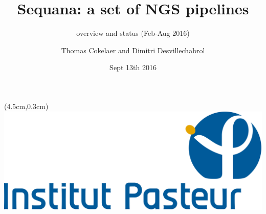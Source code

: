 \documentclass{beamer}
\title{Sequana: a set of NGS pipelines}
\subtitle{overview and status (Feb-Aug 2016)}
\author[T.Cokelaer \& D.Desvillechabrol]{Thomas Cokelaer and Dimitri Desvillechabrol}
\institute{Institut Pasteur}
\date{Sept 13th 2016}
\begin{document}

\begin{frame}[plain]
    \titlepage
    \begin{textblock*}{5cm}(4.5cm,0.3cm)
        \includegraphics[scale=0.09]{Institut_Pasteur.png}
    \end{textblock*}
\end{frame}

\end{document}
